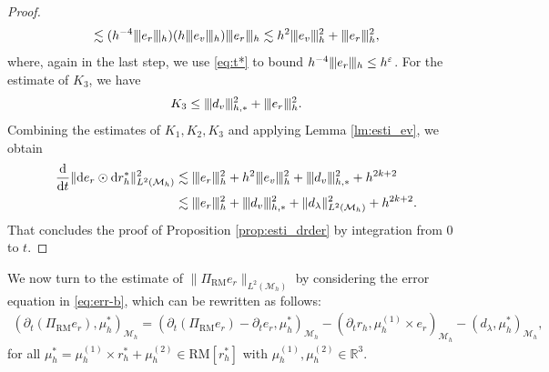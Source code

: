 \documentclass[11pt,a4paper,oneside,reqno]{amsart}
\theoremstyle{definition}
\theoremstyle{plain}
\numberwithin{theorem}{section}
\numberwithin{proposition}{section}
\numberwithin{lemma}{section}
\numberwithin{equation}{section}
\newcommand{\Man}{\mathcal{M}}
\newcommand{\RM}{\mathrm{RM}}
\newcommand{\normt}[1]{%
	\vert\kern-0.9pt\vert\kern-0.9pt\vert #1
	\vert\kern-0.9pt\vert\kern-0.9pt\vert}
\begin{document}
\begin{proof}
\[\lesssim (h^{-4}\normt{e_r}_h) (h\normt{e_v}_h) \normt{e_r}_h
\lesssim h^2\normt{ e_v }_h^2 + \normt{ e_r }_h^2,
\]
where, again in the last step, we use \eqref{eq:t*} to bound \(h^{-4}\normt{e_r}_h \le h^{\varepsilon}\).
For the estimate of $K_3$, we have 
\[ 
    K_3 \leq \normt{ d_v }_{h,*}^2 + \normt{e_r}_h^2.
 \]
Combining the estimates of $K_1, K_2, K_3$ and applying Lemma \ref{lm:esti_ev}, we obtain 
\[ \begin{aligned}
  \frac{\mathrm{d}}{\mathrm{d}t}\|\mathrm{d} e_{r} \odot \mathrm{d} r_h^*\|_{L^2(\Man_h)}^2  
  &\lesssim    \normt{e_r}_h^2 + h^2\normt{ e_v}_h^2 + \normt{ d_v }_{h,*}^2 + h^{2k+2}  \\ 
  &\lesssim   
   \normt{e_r}_h^2 + \normt{ d_v }_{h,*}^2 + \|d_\lambda \|_{L^2(\Man_h)}^2 + h^{2k+2}.
\end{aligned} \]
That concludes the proof of Proposition \ref{prop:esti_drder} by integration from $0$ to $t$.
\end{proof}

We now turn to the estimate of $\| \Pi_{\RM} e_r\|_{L^2(\Man_h)}$ by considering the error equation in \eqref{eq:err-b}, which can be rewritten as follows:  
\begin{equation}\label{eq:err-b-re} 
\begin{aligned}
    ( \partial_t (\Pi_{\RM} e_r), \mu_h^* )_{\Man_h} = (\partial_t (\Pi_{\RM} e_r) - \partial_t e_r, \mu_h^* )_{\Man_h} 
    - (\partial_t r_h, \mu_h^{(1)} \times e_r)_{\Man_h} - (d_{\lambda}, \mu_h^*)_{\Man_h},
\end{aligned}
\end{equation} 
for all $ \mu_h^* = \mu_h^{(1)} \times r_h^* + \mu_h^{(2)} \in \RM[r_h^*] $ with $\mu_h^{(1)}, \mu_h^{(2)} \in \mathbb{R}^3$.
\end{document}
